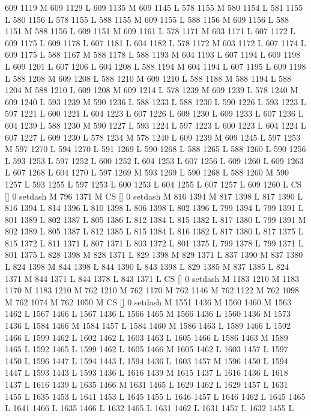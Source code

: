 {{{{{{{{{{{{{{{{{{{{{{{{{{{609 1119 M 609 1129 L
609 1135 M 609 1145 L
578 1155 M 580 1154 L
581 1155 L
580 1156 L
578 1155 L
588 1155 M 609 1155 L
588 1156 M 609 1156 L
588 1151 M 588 1156 L
609 1151 M 609 1161 L
578 1171 M 603 1171 L
607 1172 L
609 1175 L
609 1178 L
607 1181 L
604 1182 L
578 1172 M 603 1172 L
607 1174 L
609 1175 L
588 1167 M 588 1178 L
588 1193 M 604 1193 L
607 1194 L
609 1198 L
609 1201 L
607 1206 L
604 1208 L
588 1194 M 604 1194 L
607 1195 L
609 1198 L
588 1208 M 609 1208 L
588 1210 M 609 1210 L
588 1188 M 588 1194 L
588 1204 M 588 1210 L
609 1208 M 609 1214 L
578 1239 M 609 1239 L
578 1240 M 609 1240 L
593 1239 M 590 1236 L
588 1233 L
588 1230 L
590 1226 L
593 1223 L
597 1221 L
600 1221 L
604 1223 L
607 1226 L
609 1230 L
609 1233 L
607 1236 L
604 1239 L
588 1230 M 590 1227 L
593 1224 L
597 1223 L
600 1223 L
604 1224 L
607 1227 L
609 1230 L
578 1234 M 578 1240 L
609 1239 M 609 1245 L
597 1253 M 597 1270 L
594 1270 L
591 1269 L
590 1268 L
588 1265 L
588 1260 L
590 1256 L
593 1253 L
597 1252 L
600 1252 L
604 1253 L
607 1256 L
609 1260 L
609 1263 L
607 1268 L
604 1270 L
597 1269 M 593 1269 L
590 1268 L
588 1260 M 590 1257 L
593 1255 L
597 1253 L
600 1253 L
604 1255 L
607 1257 L
609 1260 L
CS [] 0 setdash M
796 1371 M CS [] 0 setdash M
816 1394 M 817 1398 L
817 1390 L
816 1394 L
814 1396 L
810 1398 L
806 1398 L
802 1396 L
799 1394 L
799 1391 L
801 1389 L
802 1387 L
805 1386 L
812 1384 L
815 1382 L
817 1380 L
799 1391 M 802 1389 L
805 1387 L
812 1385 L
815 1384 L
816 1382 L
817 1380 L
817 1375 L
815 1372 L
811 1371 L
807 1371 L
803 1372 L
801 1375 L
799 1378 L
799 1371 L
801 1375 L
828 1398 M 828 1371 L
829 1398 M 829 1371 L
837 1390 M 837 1380 L
824 1398 M 844 1398 L
844 1390 L
843 1398 L
829 1385 M 837 1385 L
824 1371 M 844 1371 L
844 1378 L
843 1371 L
CS [] 0 setdash M
1183 1210 M 1183 1170 M 1183 1210 M 762 1210 M 762 1170 M 762 1146 M 762 1122 M 762 1098 M 762 1074 M 762 1050 M CS [] 0 setdash M
1551 1436 M 1560 1460 M 1563 1462 L
1567 1466 L
1567 1436 L
1566 1465 M 1566 1436 L
1560 1436 M 1573 1436 L
1584 1466 M 1584 1457 L
1584 1460 M 1586 1463 L
1589 1466 L
1592 1466 L
1599 1462 L
1602 1462 L
1603 1463 L
1605 1466 L
1586 1463 M 1589 1465 L
1592 1465 L
1599 1462 L
1605 1466 M 1605 1462 L
1603 1457 L
1597 1450 L
1596 1447 L
1594 1443 L
1594 1436 L
1603 1457 M 1596 1450 L
1594 1447 L
1593 1443 L
1593 1436 L
1616 1439 M 1615 1437 L
1616 1436 L
1618 1437 L
1616 1439 L
1635 1466 M 1631 1465 L
1629 1462 L
1629 1457 L
1631 1455 L
1635 1453 L
1641 1453 L
1645 1455 L
1646 1457 L
1646 1462 L
1645 1465 L
1641 1466 L
1635 1466 L
1632 1465 L
1631 1462 L
1631 1457 L
1632 1455 L
}}}}}}}}}}}}}}}}}}}}}}}}}}}
